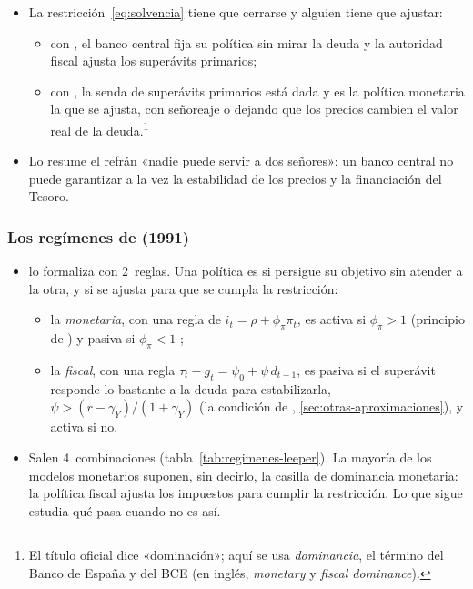\documentclass[11pt]{article}
\begin{document}
\begin{itemize}
\item La restricción~\eqref{eq:solvencia} tiene que cerrarse y alguien tiene que ajustar\nocite{SargentWallace1981Some}:
  \begin{itemize}
  \item con , el banco central fija su política sin mirar la deuda y la autoridad fiscal ajusta los superávits primarios;
  \item con , la senda de superávits primarios está dada y es la política monetaria la que se ajusta, con señoreaje o dejando que los precios cambien el valor real de la deuda.\footnote{El título oficial dice «dominación»; aquí se usa \emph{dominancia}, el término del Banco de España y del BCE (en inglés, \emph{monetary} y \emph{fiscal dominance}).}
  \end{itemize}
\item Lo resume el refrán «nadie puede servir a dos señores»: un banco central no puede garantizar a la vez la estabilidad de los precios y la financiación del Tesoro.
\end{itemize}

\subsubsection{Los regímenes de  (1991)}\label{sec:regimenes}

\begin{itemize}
\item \textcite{Leeper1991} lo formaliza con 2~reglas. Una política es  si persigue su objetivo sin atender a la otra, y  si se ajusta para que se cumpla la restricción:
  \begin{itemize}
  \item la \emph{monetaria}, con una regla de  $i_t=\rho+\phi_\pi\pi_t$, es activa si $\phi_\pi>1$ (principio de ) y pasiva si $\phi_\pi<1$  ;
  \item la \emph{fiscal}, con una regla $\tau_t-g_t=\psi_0+\psi\,d_{t-1}$, es pasiva si el superávit responde lo bastante a la deuda para estabilizarla, $\psi>(r-\gamma_Y)/(1+\gamma_Y)$ (la condición de , \ref{sec:otras-aproximaciones}), y activa si no.
  \end{itemize}
\item Salen 4~combinaciones (tabla~\ref{tab:regimenes-leeper}). La mayoría de los modelos monetarios suponen, sin decirlo, la casilla de dominancia monetaria: la política fiscal ajusta los impuestos para cumplir la restricción. Lo que sigue estudia qué pasa cuando no es así.
\end{itemize}
\end{document}

